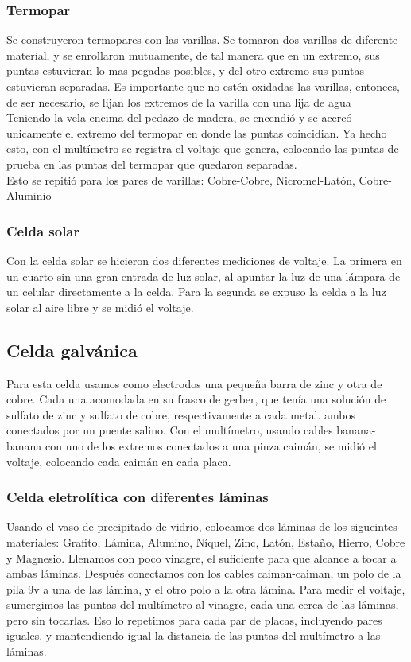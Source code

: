 \documentclass[article,12pt]{elsarticle}
\begin{document}
    \subsubsection{Termopar}
    Se construyeron termopares con las varillas. Se tomaron dos varillas de diferente material, y se enrollaron mutuamente, de tal manera que en un extremo, sus puntas estuvieran lo mas pegadas posibles, y del otro extremo sus puntas estuvieran separadas. Es importante que no estén oxidadas las varillas, entonces, de ser necesario, se lijan los extremos de la varilla con una lija de agua\\ 
    Teniendo la vela encima del pedazo de madera, se  encendió y se acercó unicamente el extremo del termopar en donde las puntas coincidian. Ya hecho esto, con el multímetro se registra el voltaje que genera, colocando las puntas de prueba en las puntas del termopar que quedaron separadas.\\
    Esto se repitió para los pares de varillas: Cobre-Cobre, Nicromel-Latón, Cobre-Aluminio
    \subsubsection{Celda solar}
    Con la celda solar se hicieron dos diferentes mediciones de voltaje. La primera en un cuarto sin una gran entrada de luz solar, al apuntar la luz de una lámpara de un celular directamente a la celda. Para la segunda se expuso la celda a la luz solar al aire libre y se midió el voltaje.
    \subsection{Celda galvánica}
    Para esta celda usamos como electrodos una pequeña barra de zinc y otra de cobre. Cada una acomodada en su frasco de gerber, que tenía una solución de sulfato de zinc y sulfato de cobre, respectivamente a cada metal. ambos conectados por un puente salino. Con el multímetro, usando cables banana-banana con uno de los extremos conectados a una pinza caimán, se midió el voltaje, colocando cada caimán en cada placa.
    \subsubsection{Celda eletrolítica con diferentes láminas}
    Usando el vaso de precipitado de vidrio, colocamos dos láminas de los sigueintes materiales: Grafito, Lámina, Alumino, Níquel, Zinc, Latón, Estaño, Hierro, Cobre y Magnesio.  Llenamos con poco vinagre, el suficiente para que alcance a tocar a ambas láminas. Después conectamos con los cables caiman-caiman, un polo de la pila 9v a una de las lámina, y el otro polo a la otra lámina. Para medir el voltaje, sumergimos las puntas del multímetro al vinagre, cada una cerca de las láminas, pero sin tocarlas.
    Eso lo repetimos para cada par de placas, incluyendo pares iguales. y mantendiendo igual la distancia de las puntas del multímetro a las láminas.
\end{document}
